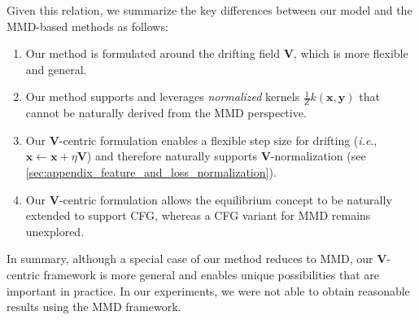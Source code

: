 \documentclass{article}
\newcommand{\vv}[1]{\mathbf{#1}}
\newcommand{\x}{\vv{x}}
\newcommand{\y}{\vv{y}}
\newcommand{\V}{\vv{V}}
\def\onedot{.}
\def\ie{\emph{i.e}\onedot} \def\Ie{\emph{I.e}\onedot}
\def\cf{\emph{cf}\onedot} \def\Cf{\emph{Cf}\onedot}
\theoremstyle{plain}
\theoremstyle{definition}
\theoremstyle{remark}
\begin{document}
Given this relation, we summarize the key differences between our model and the MMD-based methods as follows:
\begin{enumerate}
[itemsep=1pt, topsep=1pt, parsep=1pt, partopsep=1pt, label=(\roman*)]
    \item Our method is formulated around the drifting field $\V$, which is more flexible and general.
    \item Our method supports and leverages \textit{normalized} kernels $\frac{1}{Z}k(\x, \y)$ that cannot be naturally derived from the MMD perspective.
    \item Our $\V$-centric formulation enables a flexible step size for drifting (\ie, $\x \leftarrow \x{+}\eta\V$) and therefore naturally supports $\V$-normalization (see \ref{sec:appendix_feature_and_loss_normalization}).
    \item Our $\V$-centric formulation allows the equilibrium concept to be naturally extended to support CFG, whereas a CFG variant for MMD remains unexplored.
\end{enumerate}
In summary, although a special case of our method reduces to MMD, our $\V$-centric framework is more general and enables unique possibilities that are important in practice.
In our experiments, we were not able to obtain reasonable results using the MMD framework.


\end{document}
